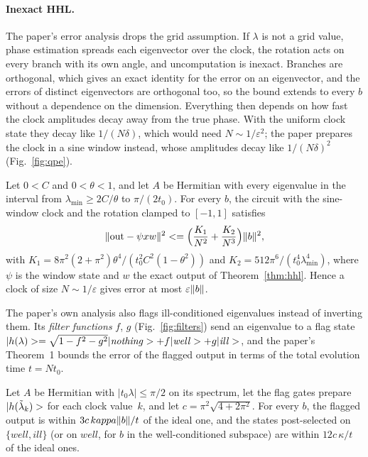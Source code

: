 \paragraph{Inexact HHL.} The paper's error analysis drops the grid assumption. If $\lambda$ is not a
grid value, phase estimation spreads each eigenvector over the clock, the rotation acts on every
branch with its own angle, and uncomputation is inexact. Branches are orthogonal, which gives an exact
identity for the error on an eigenvector, and the errors of distinct eigenvectors are orthogonal too, so
the bound extends to every $b$ without a dependence on the dimension. Everything then depends on how fast
the clock amplitudes decay away from the true phase. With the uniform clock state they decay like
$1/(N\delta)$, which would need $N\sim1/\varepsilon^2$; the paper prepares the clock in a sine window
instead, whose amplitudes decay like $1/(N\delta)^2$ (Fig.~\ref{fig:qpe}).

\begin{theorem}\label{thm:window}
Let $0<C$ and $0<\theta<1$, and let $A$ be Hermitian with every eigenvalue in the
interval from $\lambda_{\min}\ge2C/\theta$ to $\pi/(2t_0)$. For every $b$, the circuit with the sine-window clock and the rotation clamped
to $[-1,1]$ satisfies
\[
\|\mathrm{out}-\psi x w\|^2<=\Bigl(\frac{K_1}{N^2}+\frac{K_2}{N^3}\Bigr)\|b\|^2,
\]
with $K_1=8\pi^2(2+\pi^2)\theta^4/(t_0^2C^2(1-\theta^2))$ and $K_2=512\pi^6/(t_0^4\lambda_{\min}^4)$,
where $\psi$ is the window state and $w$ the exact output of Theorem~\ref{thm:hhl}. Hence a clock of size
$N\sim1/\varepsilon$ gives error at most $\varepsilon\|b\|$.
\end{theorem}

The paper's own analysis also flags ill-conditioned eigenvalues instead of inverting them. Its
\emph{filter functions} $f$, $g$ (Fig.~\ref{fig:filters}) send an eigenvalue to a flag state
$|h(\lambda)>=\sqrt{1-f^2-g^2}|\mathit{nothing}>+f|\mathit{well}>+g|\mathit{ill}>$, and the
paper's Theorem~1 bounds the error of the flagged output in terms of the total evolution time $t=Nt_0$.

\begin{theorem}\label{thm:thm1}
Let $A$ be Hermitian with $|t_0\lambda|\le\pi/2$ on its spectrum, let the flag gates prepare
$|h(\tilde\lambda_k)>$ for each clock value~$k$, and let $c=\pi^2\sqrt{4+2\pi^2}$. For every $b$, the
flagged output is within $3c\,kappa\|b\|/t$ of the ideal one, and the states post-selected on
$\{\mathit{well},\mathit{ill}\}$ (or on $\mathit{well}$, for $b$ in the well-conditioned subspace) are within
$12c\,\kappa/t$ of the ideal ones.
\end{theorem}

